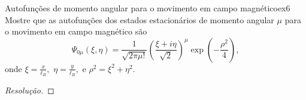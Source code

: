 \begin{exercício}{Autofunções de momento angular para o movimento em campo magnético}{ex6}
   Mostre que as autofunções dos estados estacionários de momento angular \(\mu\) para o movimento em campo magnético são
   \begin{equation*}
      \Psi_{0\mu}(\xi, \eta) = \frac1{\sqrt{2\pi \mu!}}\left(\frac{\xi + i \eta}{\sqrt{2}}\right)^\mu \exp\left(-\frac{\rho^2}{4}\right),
   \end{equation*}
   onde \(\xi = \frac{x}{\ell_B},\) \(\eta = \frac{y}{\ell_B},\) e \(\rho^2 = \xi^2 + \eta^2.\)
\end{exercício}
\begin{proof}[Resolução]


\end{proof}
